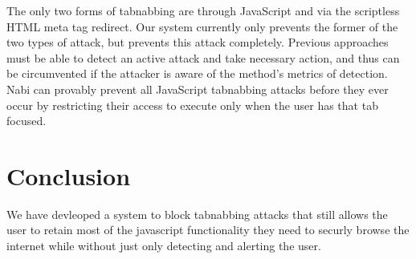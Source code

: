 \documentclass[12pt]{article}
\begin{document}
\begin{doublespace}
The only two forms of tabnabbing are through JavaScript and via the scriptless HTML meta tag redirect. Our system currently only prevents the former of the two types of attack, but prevents this attack completely. Previous approaches must be able to detect an active attack and take necessary action, and thus can be circumvented if the attacker is aware of the method's metrics of detection. Nabi can provably prevent all JavaScript tabnabbing attacks before they ever occur by restricting their access to execute only when the user has that tab focused.





\section{Conclusion}

We have devleoped a system to block tabnabbing attacks that still allows the user to retain most of the javascript functionality they need to securly browse the internet while without just only detecting and alerting the user. 


\end{doublespace}




\end{document}
